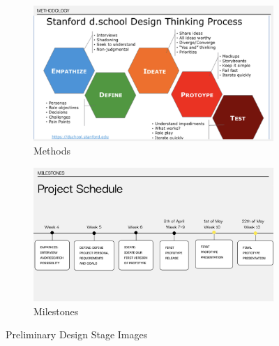 \begin{figure}[H]
  \begin{subfigure}[b]{0.3\textwidth}
    \includegraphics[width=\textwidth]{screenshot/priliminary_methods.png}
    \caption{Methods}
  \end{subfigure}

  \vspace{0.5cm}

  \begin{subfigure}[b]{0.3\textwidth}
    \includegraphics[width=\textwidth]{screenshot/priliminary_milestones.png}
    \caption{Milestones}
  \end{subfigure}
  \caption{Preliminary Design Stage Images}
  \label{fig:preliminary}
\end{figure}

